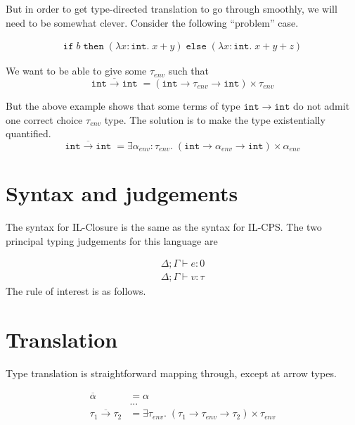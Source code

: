 \documentclass{article}
\newcommand{\kwd}[1]{\ensuremath{\mathtt{#1}}}
\newcommand{\intt}{\ensuremath{\mathtt{int}}}
\begin{document}
But in order to get type-directed translation to go through smoothly, we will
need to be somewhat clever. Consider the following ``problem'' case.

\begin{align*}
  \kwd{if} \; b \; \kwd{then} \; (\lambda x : \intt. \; x + y) \; \kwd{else} \; (\lambda x : \intt. \; x + y + z)
\end{align*}

We want to be able to give some $\tau_{env}$ such that
\[
  \overline{\intt \to \intt} \; = (\intt \to \tau_{env} \to \intt) \times \tau_{env}
\]

But the above example shows that some terms of type $\intt \to \intt$ do not
admit one correct choice $\tau_{env}$ type. The solution is to make the type
existentially quantified.
\[
  \overline{\intt \to \intt} \; = \exists \alpha_{env} : \tau_{env}. \; (\intt \to \alpha_{env} \to \intt) \times \alpha_{env}
\]

\section{Syntax and judgements}

The syntax for IL-Closure is the same as the syntax for IL-CPS. The two
principal typing judgements for this language are

\[
  \begin{array}{l}
    \Delta ; \Gamma \vdash e : 0 \\
    \Delta ; \Gamma \vdash v : \tau
  \end{array}
\]
The rule of interest is as follows.


\section{Translation}

Type translation is straightforward mapping through, except at arrow types.

\begin{align*}
    \overline{\alpha} &= \alpha \\
    &... \\
    \overline{\tau_1 \to \tau_2} &= \exists \tau_{env}. \; (\tau_1 \to \tau_{env} \to \tau_2) \times \tau_{env}
\end{align*}
\end{document}

